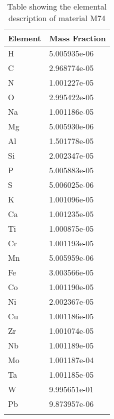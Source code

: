 \begin{centering}
\begin{longtable}[ht!]
  { p{} | p{} }
\hline
Element & Mass Fraction\\
\hline
H &  5.005935e-06\\
C &  2.968774e-05\\
N &  1.001227e-05\\
O &  2.995422e-05\\
Na &  1.001186e-05\\
Mg &  5.005930e-06\\
Al &  1.501778e-05\\
Si &  2.002347e-05\\
P &  5.005883e-05\\
S &  5.006025e-06\\
K &  1.001096e-05\\
Ca &  1.001235e-05\\
Ti &  1.000875e-05\\
Cr &  1.001193e-05\\
Mn &  5.005959e-06\\
Fe &  3.003566e-05\\
Co &  1.001190e-05\\
Ni &  2.002367e-05\\
Cu &  1.001186e-05\\
Zr &  1.001074e-05\\
Nb &  1.001189e-05\\
Mo &  1.001187e-04\\
Ta &  1.001185e-05\\
W &  9.995651e-01\\
Pb &  9.873957e-06\\
\caption{Table showing the elemental description of material M74}
\label{table:material_M74}
\end{longtable}
\clearpage


\end{centering}
